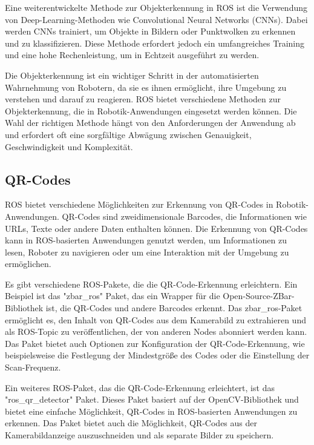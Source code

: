     Eine weiterentwickelte Methode zur Objekterkennung in \ac{ROS} ist die Verwendung von Deep-Learning-Methoden wie Convolutional Neural Networks (CNNs). Dabei werden CNNs trainiert, um Objekte in Bildern oder Punktwolken zu erkennen und zu klassifizieren. Diese Methode erfordert jedoch ein umfangreiches Training und eine hohe Rechenleistung, um in Echtzeit ausgeführt zu werden.

    Die Objekterkennung ist ein wichtiger Schritt in der automatisierten Wahrnehmung von Robotern, da sie es ihnen ermöglicht, ihre Umgebung zu verstehen und darauf zu reagieren. \ac{ROS} bietet verschiedene Methoden zur Objekterkennung, die in Robotik-Anwendungen eingesetzt werden können. Die Wahl der richtigen Methode hängt von den Anforderungen der Anwendung ab und erfordert oft eine sorgfältige Abwägung zwischen Genauigkeit, Geschwindigkeit und Komplexität.

    \subsection{QR-Codes} \label{qr-codes:subsection}
    \ac{ROS} bietet verschiedene Möglichkeiten zur Erkennung von QR-Codes in Robotik-Anwendungen. QR-Codes sind zweidimensionale Barcodes, die Informationen wie URLs, Texte oder andere Daten enthalten können. Die Erkennung von QR-Codes kann in \ac{ROS}-basierten Anwendungen genutzt werden, um Informationen zu lesen, Roboter zu navigieren oder um eine Interaktion mit der Umgebung zu ermöglichen.

    Es gibt verschiedene \ac{ROS}-Pakete, die die QR-Code-Erkennung erleichtern. Ein Beispiel ist das "zbar\_ros" Paket, das ein Wrapper für die Open-Source-ZBar-Bibliothek ist, die QR-Codes und andere Barcodes erkennt. Das zbar\_ros-Paket ermöglicht es, den Inhalt von QR-Codes aus dem Kamerabild zu extrahieren und als \ac{ROS}-Topic zu veröffentlichen, der von anderen Nodes abonniert werden kann. Das Paket bietet auch Optionen zur Konfiguration der QR-Code-Erkennung, wie beispielsweise die Festlegung der Mindestgröße des Codes oder die Einstellung der Scan-Frequenz.

    Ein weiteres \ac{ROS}-Paket, das die QR-Code-Erkennung erleichtert, ist das "ros\_qr\_detector" Paket. Dieses Paket basiert auf der OpenCV-Bibliothek und bietet eine einfache Möglichkeit, QR-Codes in \ac{ROS}-basierten Anwendungen zu erkennen. Das Paket bietet auch die Möglichkeit, QR-Codes aus der Kamerabildanzeige auszuschneiden und als separate Bilder zu speichern.

